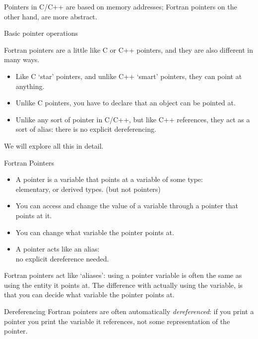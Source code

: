 
Pointers in C/C++ are based on memory addresses; 
Fortran pointers on the other hand, are more
abstract.

 {Basic pointer operations}

Fortran pointers are a little like C or C++ pointers,
and they are also different in many ways.
\begin{itemize}
\item Like C `star' pointers, and unlike C++ `smart' pointers, they can point at anything.
\item Unlike C pointers, you have to declare that an object can be pointed at.
\item Unlike any sort of pointer in C/C++, but like C++ references,
  they act as a sort of alias: there is no explicit dereferencing.
\end{itemize}
We will explore all this in detail.

\begin{slide}{Fortran Pointers}
  \label{sl:fpoint}
  \begin{itemize}
  \item A pointer is a variable that points at a variable of some type:\\
    elementary, or derived types. (but not pointers)
  \item You can access and change the value of a variable through a pointer
    that points at it.
  \item You can change what variable the pointer points at.
  \item A pointer acts like an alias: \\
    no explicit dereference needed.
  \end{itemize}
\end{slide}

Fortran pointers act like `aliases': using a pointer variable
is often the same as using the entity it points at.
The difference with actually using the variable, is
that you can decide what variable the pointer points at.

\begin{block}{Dereferencing}
  \label{sl:cpoint-vs-fpoint}
  Fortran pointers are often automatically
  \emph{dereferenced}: if you print a
  pointer you print the variable it references, not some representation
  of the pointer.
\end{block}

